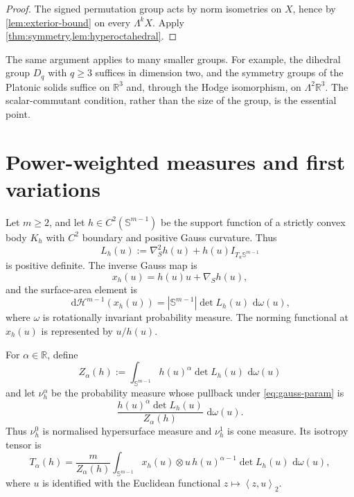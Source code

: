 \documentclass[11pt,a4paper]{amsart}
\numberwithin{equation}{section}
\theoremstyle{plain}
\theoremstyle{definition}
\theoremstyle{remark}
\newcommand{\R}{\mathbb{R}}
\newcommand{\dd}{\,\mathrm{d}}
\newcommand{\Id}{I}
\newcommand{\sphere}{\mathbb{S}}
\newcommand{\ip}[2]{\left\langle #1,#2\right\rangle_2}
\newcommand{\abs}[1]{\left|#1\right|}
\begin{document}
\begin{proof}
The signed permutation group acts by norm isometries on $X$, hence by \cref{lem:exterior-bound} on every $\Lambda^kX$. Apply \cref{thm:symmetry,lem:hyperoctahedral}.
\end{proof}

The same argument applies to many smaller groups. For example, the dihedral group $D_q$ with $q\geqslant3$ suffices in dimension two, and the symmetry groups of the Platonic solids suffice on $\R^3$ and, through the Hodge isomorphism, on $\Lambda^2\R^3$. The scalar-commutant condition, rather than the size of the group, is the essential point.

\section{Power-weighted measures and first variations}\label{sec:variation}

Let $m\geqslant2$, and let $h\in C^2(\sphere^{m-1})$ be the support function of a strictly convex body $K_h$ with $C^2$ boundary and positive Gauss curvature. Thus
\[
L_h(u):=\nabla_S^2h(u)+h(u)\Id_{T_u\sphere^{m-1}}
\]
is positive definite. The inverse Gauss map is
\begin{equation}\label{eq:gauss-param}
x_h(u)=h(u)u+\nabla_Sh(u),
\end{equation}
and the surface-area element is
\begin{equation}\label{eq:surface-density-support}
\dd\mathcal H^{m-1}(x_h(u))
=\abs{\sphere^{m-1}}\det L_h(u)\,\dd\omega(u),
\end{equation}
where $\omega$ is rotationally invariant probability measure. The norming functional at $x_h(u)$ is represented by $u/h(u)$.

For $\alpha\in\R$, define
\begin{equation}\label{eq:Z-alpha}
Z_\alpha(h):=\int_{\sphere^{m-1}}h(u)^\alpha\det L_h(u)\,\dd\omega(u)
\end{equation}
and let $\nu_h^\alpha$ be the probability measure whose pullback under \eqref{eq:gauss-param} is
\begin{equation}\label{eq:alpha-measure}
\frac{h(u)^\alpha\det L_h(u)}{Z_\alpha(h)}\,\dd\omega(u).
\end{equation}
Thus $\nu_h^0$ is normalised hypersurface measure and $\nu_h^1$ is cone measure. Its isotropy tensor is
\begin{equation}\label{eq:T-alpha}
T_\alpha(h)
=\frac{m}{Z_\alpha(h)}
\int_{\sphere^{m-1}}x_h(u)\otimes u\,
 h(u)^{\alpha-1}\det L_h(u)\,\dd\omega(u),
\end{equation}
where $u$ is identified with the Euclidean functional $z\mapsto\ip{z}{u}$.
\end{document}
